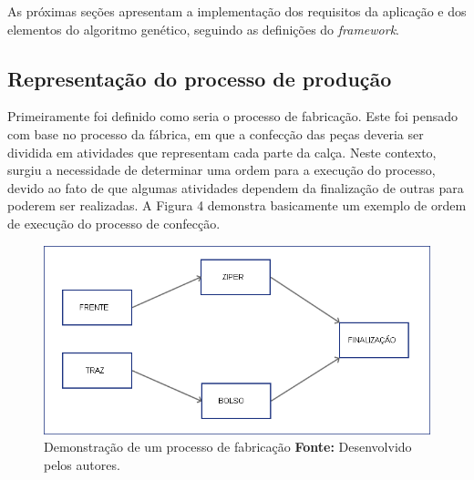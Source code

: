 \begin{itemize}
	
	
	
\end{itemize}

\par As próximas seções apresentam a implementação dos requisitos da aplicação
e dos elementos do algoritmo genético, seguindo as definições do \textit{framework}.

\subsection{Representação do processo de produção}

\par Primeiramente foi definido como seria o processo de fabricação. Este foi pensado com base no 
processo da fábrica, em que a confecção das peças deveria ser dividida em atividades que representam
cada parte da calça. Neste contexto, surgiu a necessidade de determinar uma ordem para a execução do processo, 
devido ao fato de que algumas atividades dependem da finalização de outras para poderem ser
realizadas. A Figura 4 demonstra basicamente um exemplo de ordem de execução do
processo de confecção.

\newpage

\begin{figure}[h!]
	\centerline{\includegraphics[scale=0.6]{./imagens/processo1.png}}
	\caption[Demonstração de um processo de fabricação]
	{Demonstração de um processo de fabricação \textbf{Fonte:} Desenvolvido pelos
	autores.}
	\label{fig:exemplo1}
\end{figure}

